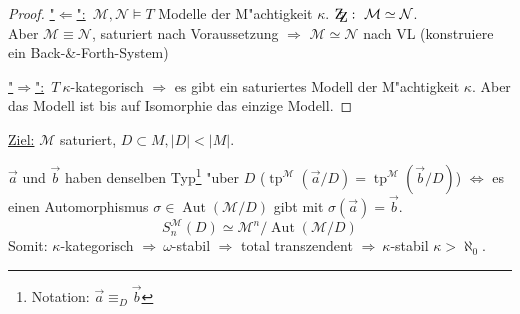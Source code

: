 \documentclass[a4paper,12pt,numbers=noenddot,parskip=full]{scrartcl}
\newcommand{\scrM}{\mathcal{M}}
\newcommand{\scrN}{\mathcal{N}}
\newcommand{\zz}{\mathrm{Z\kern-.3em\raise-0.5ex\hbox{Z}}:~}
\newcommand{\hin}{\underline{"$\Rightarrow$":}~}
\newcommand{\rueck}{\underline{"$\Leftarrow$":}~}
\DeclareMathOperator{\au}{Aut}
\DeclareMathOperator{\typ}{tp}
\theoremstyle{dotless}
\begin{document}
\begin{proof}
	\rueck $\scrM, \scrN \models T$ Modelle der M"achtigkeit $\kappa$. $\zz \scrM \simeq \scrN$.\\
	Aber $\scrM \equiv \scrN$, saturiert nach Voraussetzung $\Rightarrow$ $\scrM \simeq \scrN$ nach VL (konstruiere ein Back-\&-Forth-System)%
	
	\hin $T~\kappa$-kategorisch $\Rightarrow$ %
	es gibt ein saturiertes Modell der M"achtigkeit $\kappa$. Aber das Modell ist bis auf Isomorphie das einzige Modell.
\end{proof}
\underline{Ziel:} $\scrM$ saturiert, $D \subset M, |D|<|M|$.

$\vec{a}$ und $\vec{b}$ haben denselben Typ\footnote{Notation: $\vec{a} \equiv_D \vec{b}$} "uber $D$ ($\typ^\scrM\left(\vec{a}/D\right)=\typ^\scrM\left(\vec{b}/D\right)$) $\Longleftrightarrow$ es einen Automorphismus $\sigma \in \au (\scrM/D)$ gibt mit $\sigma(\vec{a})=\vec{b}$.
\begin{equation*}
	S_n^\scrM (D) \simeq \scrM^n / \au(\scrM/D)
\end{equation*}
Somit: $\kappa$-kategorisch $\Rightarrow~ \omega$-stabil $\Rightarrow$ total transzendent $\Rightarrow~ \kappa$-stabil $\kappa>\aleph_0$.
\end{document}
